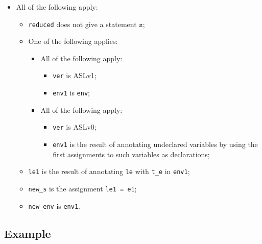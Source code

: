 \documentclass{book}
\newcommand\vs[0]{\texttt{s}}
\begin{document}
\begin{itemize}
\begin{itemize}
\begin{itemize}
     \item All of the following apply:
       \begin{itemize}
       \item \texttt{reduced} does not give a statement $\vs$;
       \item One of the following applies:
         \begin{itemize}
         \item All of the following apply:
           \begin{itemize}
           \item \texttt{ver} is ASLv1;
           \item \texttt{env1} is \texttt{env};
           \end{itemize}
         \item All of the following apply:
           \begin{itemize}
           \item \texttt{ver} is ASLv0;
	   \item \texttt{env1} is the result of annotating undeclared variables by using
	      the first assignments to such variables as declarations;
           \end{itemize}
         \end{itemize}

       \item \texttt{le1} is the result of annotating \texttt{le} with \texttt{t\_e} in \texttt{env1};
       \item \texttt{new\_s} is the assignment \texttt{le1 = e1};
       \item \texttt{new\_env} is \texttt{env1}.
       \end{itemize}
    \end{itemize}
  \end{itemize}

  \subsection{Example}



\begin{emptyformal}

\end{emptyformal}
\end{itemize}
\end{document}
